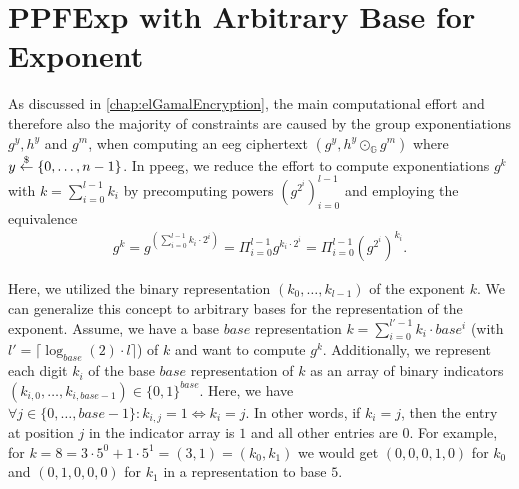 
\chapter{PPFExp with Arbitrary Base for Exponent}

\label{section:appendix:ppeegArbitraryBase}

As discussed in \cref{chap:elGamalEncryption}, the main computational effort and therefore also the majority of constraints are caused by the group exponentiations $g^y, h^y$ and $g^m$, when computing an \gls{eeg} ciphertext $(g^y, h^y\odot_\mathbb{G} g^m)$ where $y\overset{\$}{\gets}\{0,\dots, n-1\}$.
In \gls{ppeeg}, we reduce the effort to compute exponentiations $g^k$ with $k=\sum_{i=0}^{l-1}k_i$ by precomputing powers $\left(g^{2^i}\right)_{i=0}^{l-1}$ and employing the equivalence
\begin{align*}
    g^k=g^{\left(\sum_{i=0}^{l-1}k_i\cdot 2^i\right)}=\Pi_{i=0}^{l-1}g^{k_i\cdot 2^i}=\Pi_{i=0}^{l-1}\left(g^{2^i}\right)^{k_i}\text{.}
\end{align*}

Here, we utilized the binary representation $(k_0,\dots, k_{l-1})$ of the exponent $k$. 
We can generalize this concept to arbitrary bases for the representation of the exponent.
Assume, we have a base $base$ representation $k=\sum_{i=0}^{l'-1}k_i\cdot base^i$ (with $l'=\lceil\log_{base}(2)\cdot l\rceil$) of $k$ and want to compute $g^k$.
Additionally, we represent each digit $k_i$ of the base $base$ representation of $k$ as an array of binary indicators $(k_{i,0},\dots, k_{i,base-1})\in\{0,1\}^{base}$.
Here, we have $\forall j\in\{0,\dots, base-1\}: k_{i,j}=1\Leftrightarrow k_i=j$.
In other words, if $k_i=j$, then the entry at position $j$ in the indicator array is $1$ and all other entries are $0$.
For example, for $k=8=3\cdot 5^0+1\cdot 5^1=(3,1)=(k_0, k_1)$ we would get $(0,0,0,1,0)$ for $k_0$ and $(0,1,0,0,0)$ for $k_1$ in a representation to base $5$.

